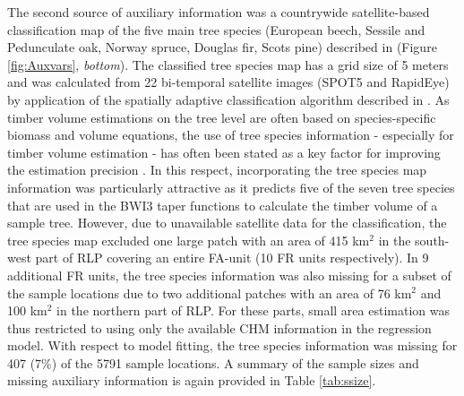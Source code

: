 The second source of auxiliary information was a countrywide satellite-based classification map of the five main tree species (European beech, Sessile and Pedunculate oak, Norway spruce, Douglas fir, Scots pine) described in \citet{stoffels2015} (Figure \ref{fig:Auxvars}, \textit{bottom}). The classified tree species map has a grid size of 5 meters and was calculated from 22 bi-temporal satellite images (SPOT5 and RapidEye) by application of the spatially adaptive classification algorithm described in \citet{stoffels2012}.  As timber volume estimations on the tree level are often based on species-specific biomass and volume equations, the use of tree species information - especially for timber volume estimation - has often been stated as a key factor for improving the estimation precision \cite{white2016}. In this respect, incorporating the tree species map information was particularly attractive as it predicts five of the seven tree species that are used in the BWI3 taper functions \citep{kublin2013} to calculate the timber volume of a sample tree. However, due to unavailable satellite data for the classification, the tree species map excluded one large patch with an area of 415 km$^2$ in the south-west part of RLP covering an entire FA-unit (10 FR units respectively). In 9 additional FR units, the tree species information was also missing for a subset of the sample locations due to two additional patches with an area of 76 km$^2$ and 100 km$^2$ in the northern part of RLP. For these parts, small area estimation was thus restricted to using only the available CHM information in the regression model. With respect to model fitting, the tree species information was missing for 407 (7\%) of the 5791 sample locations. A summary of the sample sizes and missing auxiliary information is again provided in Table \ref{tab:ssize}.


